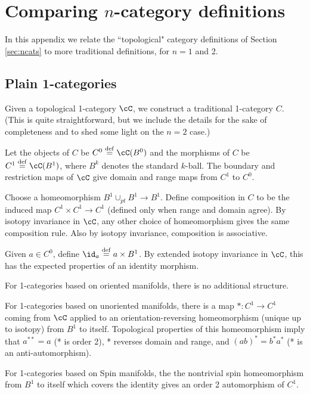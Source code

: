 
\section{Comparing $n$-category definitions}
\label{sec:comparing-defs}

In this appendix we relate the ``topological" category definitions of Section \ref{sec:ncats}
to more traditional definitions, for $n=1$ and 2.

\subsection{Plain 1-categories}

Given a topological 1-category $\cC$, we construct a traditional 1-category $C$.
(This is quite straightforward, but we include the details for the sake of completeness and
to shed some light on the $n=2$ case.)

Let the objects of $C$ be $C^0 \deq \cC(B^0)$ and the morphisms of $C$ be $C^1 \deq \cC(B^1)$, 
where $B^k$ denotes the standard $k$-ball.
The boundary and restriction maps of $\cC$ give domain and range maps from $C^1$ to $C^0$.

Choose a homeomorphism $B^1\cup_{pt}B^1 \to B^1$.
Define composition in $C$ to be the induced map $C^1\times C^1 \to C^1$ (defined only when range and domain agree).
By isotopy invariance in $\cC$, any other choice of homeomorphism gives the same composition rule.
Also by isotopy invariance, composition is associative.

Given $a\in C^0$, define $\id_a \deq a\times B^1$.
By extended isotopy invariance in $\cC$, this has the expected properties of an identity morphism.


\medskip

For 1-categories based on oriented manifolds, there is no additional structure.

For 1-categories based on unoriented manifolds, there is a map $*:C^1\to C^1$
coming from $\cC$ applied to an orientation-reversing homeomorphism (unique up to isotopy) 
from $B^1$ to itself.
Topological properties of this homeomorphism imply that 
$a^{**} = a$ (* is order 2), * reverses domain and range, and $(ab)^* = b^*a^*$
(* is an anti-automorphism).

For 1-categories based on Spin manifolds,
the the nontrivial spin homeomorphism from $B^1$ to itself which covers the identity
gives an order 2 automorphism of $C^1$.

